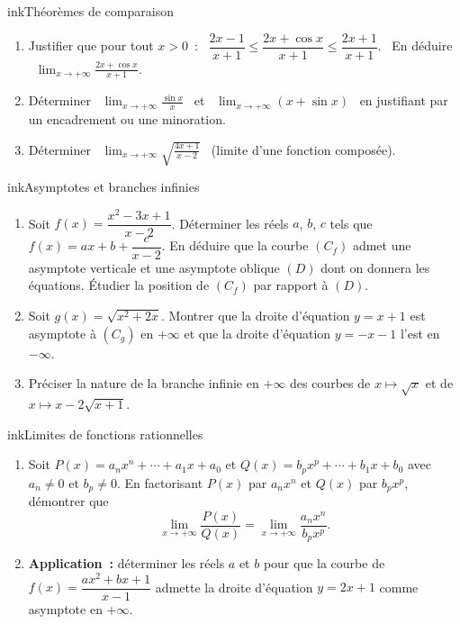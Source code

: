 \begin{exo}{ink}{Théorèmes de comparaison }
\begin{enumerate}
  \item Justifier que pour tout $x>0$~: \ $\dfrac{2x-1}{x+1}\leq\dfrac{2x+\cos x}{x+1}\leq\dfrac{2x+1}{x+1}$. \ En déduire \ $\displaystyle\lim_{x\to+\infty}\frac{2x+\cos x}{x+1}$.
  \item Déterminer \ $\displaystyle\lim_{x\to+\infty}\frac{\sin x}{x}$ \ et \ $\displaystyle\lim_{x\to+\infty}\left(x+\sin x\right)$ \ en justifiant par un encadrement ou une minoration.
  \item Déterminer \ $\displaystyle\lim_{x\to+\infty}\sqrt{\frac{4x+1}{x-2}}$ \ (limite d'une fonction composée).
\end{enumerate}
\end{exo}

\begin{exo}{ink}{Asymptotes et branches infinies \ }
\begin{enumerate}
  \item Soit $f(x)=\dfrac{x^2-3x+1}{x-2}$. Déterminer les réels $a$, $b$, $c$ tels que $f(x)=ax+b+\dfrac{c}{x-2}$. En déduire que la courbe $(C_f)$ admet une asymptote verticale et une asymptote oblique $(D)$ dont on donnera les équations. Étudier la position de $(C_f)$ par rapport à $(D)$.
  \item Soit $g(x)=\sqrt{x^2+2x}$. Montrer que la droite d'équation $y=x+1$ est asymptote à $(C_g)$ en $+\infty$ et que la droite d'équation $y=-x-1$ l'est en $-\infty$.
  \item Préciser la nature de la branche infinie en $+\infty$ des courbes de $x\mapsto\sqrt x$ et de $x\mapsto x-2\sqrt{x+1}$.
\end{enumerate}
\end{exo}

\begin{exo}{ink}{Limites de fonctions rationnelles \demo\ }
\begin{enumerate}
  \item Soit $P(x)=a_nx^n+\cdots+a_1x+a_0$ et $Q(x)=b_px^p+\cdots+b_1x+b_0$ avec $a_n\neq0$ et $b_p\neq0$. En factorisant $P(x)$ par $a_nx^n$ et $Q(x)$ par $b_px^p$, démontrer que
  \[ \lim_{x\to+\infty}\frac{P(x)}{Q(x)}=\lim_{x\to+\infty}\frac{a_nx^n}{b_px^p}. \]
  \item \textbf{Application~:} déterminer les réels $a$ et $b$ pour que la courbe de $f(x)=\dfrac{ax^2+bx+1}{x-1}$ admette la droite d'équation $y=2x+1$ comme asymptote en $+\infty$.
\end{enumerate}
\end{exo}

